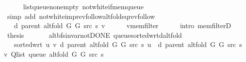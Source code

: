 \begin{isabellebody}
\ \ \ \ \isamarkupfalse%
\ list{\isacharunderscore}{\kern0pt}queue{\isacharunderscore}{\kern0pt}non{\isacharunderscore}{\kern0pt}empty\ not{\isacharunderscore}{\kern0pt}white{\isacharunderscore}{\kern0pt}if{\isacharunderscore}{\kern0pt}mem{\isacharunderscore}{\kern0pt}queue\isanewline
\ \ \ \ \isamarkupfalse%
\ {\isacharparenleft}{\kern0pt}simp\ add{\isacharcolon}{\kern0pt}\ not{\isacharunderscore}{\kern0pt}white{\isacharunderscore}{\kern0pt}imp{\isacharunderscore}{\kern0pt}rev{\isacharunderscore}{\kern0pt}follow{\isacharunderscore}{\kern0pt}alt{\isacharunderscore}{\kern0pt}fold{\isacharunderscore}{\kern0pt}eq{\isacharunderscore}{\kern0pt}rev{\isacharunderscore}{\kern0pt}follow{\isacharparenright}{\kern0pt}\isanewline
\ \ \isamarkupfalse%
\ \isamarkupfalse%
\ {\isachardoublequoteopen}{\isachardot}{\kern0pt}{\isachardot}{\kern0pt}{\isachardot}{\kern0pt}\ {\isasymle}\ d\ {\isacharparenleft}{\kern0pt}parent\ {\isacharparenleft}{\kern0pt}alt{\isacharunderscore}{\kern0pt}fold\ G{}\ G{}\ src\ s{\isacharparenright}{\kern0pt}{\isacharparenright}{\kern0pt}\ v{\isachardoublequoteclose}\isanewline
\ \ \ \ \isamarkupfalse%
\ v{\isacharunderscore}{\kern0pt}mem{\isacharunderscore}{\kern0pt}filter\isanewline
\ \ \ \ \isamarkupfalse%
\ {\isacharparenleft}{\kern0pt}intro\ mem{\isacharunderscore}{\kern0pt}filterD{\isacharparenleft}{\kern0pt}{}{\isacharparenright}{\kern0pt}{\isacharparenright}{\kern0pt}\isanewline
\ \ \isamarkupfalse%
\ \isamarkupfalse%
\ {\isacharquery}{\kern0pt}thesis\isanewline
\ \ \ \ \isacommand{{\isachardot}{\kern0pt}}\isamarkupfalse%
\isanewline
{}\isamarkupfalse%
%
\endisatagproof
{\isafoldproof}%
%
\isadelimproof
\isanewline
%
\endisadelimproof
\isanewline
{}\isamarkupfalse%
\ {\isacharparenleft}{\kern0pt}\ alt{\isacharunderscore}{\kern0pt}bfs{\isacharunderscore}{\kern0pt}invar{\isacharunderscore}{\kern0pt}not{\isacharunderscore}{\kern0pt}DONE{\isacharparenright}{\kern0pt}\ queue{\isacharunderscore}{\kern0pt}sorted{\isacharunderscore}{\kern0pt}wrt{\isacharunderscore}{\kern0pt}d{\isacharunderscore}{\kern0pt}alt{\isacharunderscore}{\kern0pt}fold{\isacharcolon}{\kern0pt}\isanewline
\ \ \ {\isachardoublequoteopen}sorted{\isacharunderscore}{\kern0pt}wrt\ {\isacharparenleft}{\kern0pt}{\isasymlambda}u\ v{\isachardot}{\kern0pt}\ d\ {\isacharparenleft}{\kern0pt}parent\ {\isacharparenleft}{\kern0pt}alt{\isacharunderscore}{\kern0pt}fold\ G{}\ G{}\ src\ s{\isacharparenright}{\kern0pt}{\isacharparenright}{\kern0pt}\ u\ {\isasymle}\ d\ {\isacharparenleft}{\kern0pt}parent\ {\isacharparenleft}{\kern0pt}alt{\isacharunderscore}{\kern0pt}fold\ G{}\ G{}\ src\ s{\isacharparenright}{\kern0pt}{\isacharparenright}{\kern0pt}\ v{\isacharparenright}{\kern0pt}\ {\isacharparenleft}{\kern0pt}Q{\isacharunderscore}{\kern0pt}list\ {\isacharparenleft}{\kern0pt}queue\ {\isacharparenleft}{\kern0pt}alt{\isacharunderscore}{\kern0pt}fold\ G{}\ G{}\ src\ s{\isacharparenright}{\kern0pt}{\isacharparenright}{\kern0pt}{\isacharparenright}{\kern0pt}{\isachardoublequoteclose}\isanewline

\end{isabellebody}
